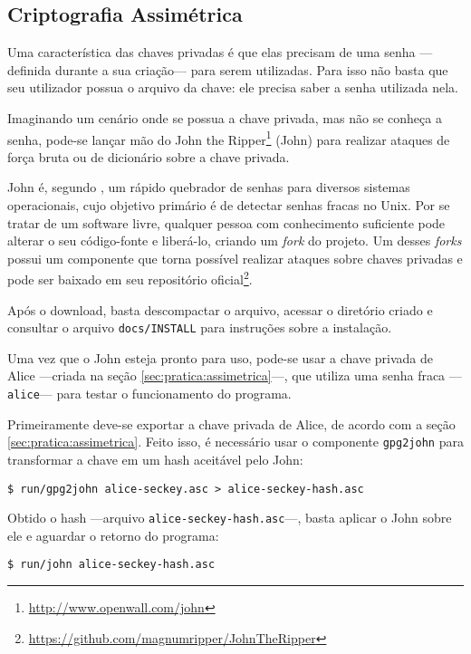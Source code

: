 \documentclass[12px,a4paper,twoside]{article}
\begin{document}
\subsection{Criptografia Assimétrica}
\label{sec:ataques:assimetrica}

Uma característica das chaves privadas é que elas precisam de uma senha
---definida durante a sua criação--- para serem utilizadas.  Para isso não
basta que seu utilizador possua o arquivo da chave: ele precisa saber a senha
utilizada nela.

Imaginando um cenário onde se possua a chave privada, mas não se conheça a
senha, pode-se lançar mão do John the
Ripper\footnote{\url{http://www.openwall.com/john}} (John) para realizar
ataques de força bruta ou de dicionário sobre a chave privada.

John é, segundo \cite{john}, um rápido quebrador de senhas para diversos
sistemas operacionais, cujo objetivo primário é de detectar senhas fracas no
Unix.  Por se tratar de um software livre, qualquer pessoa com conhecimento
suficiente pode alterar o seu código-fonte e liberá-lo, criando um
\textit{fork} do projeto.  Um desses \textit{forks} possui um componente que
torna possível realizar ataques sobre chaves privadas e pode ser baixado em seu
repositório
oficial\footnote{\url{https://github.com/magnumripper/JohnTheRipper}}.

Após o download, basta descompactar o arquivo, acessar o diretório criado e
consultar o arquivo \texttt{docs/INSTALL} para instruções sobre a instalação.

Uma vez que o John esteja pronto para uso, pode-se usar a chave privada de
Alice ---criada na seção \ref{sec:pratica:assimetrica}---, que utiliza uma
senha fraca ---\texttt{alice}--- para testar o funcionamento do programa.

Primeiramente deve-se exportar a chave privada de Alice, de acordo com a seção
\ref{sec:pratica:assimetrica}.  Feito isso, é necessário usar o componente
\texttt{gpg2john} para transformar a chave em um hash aceitável pelo John:

\begin{verbatim}
$ run/gpg2john alice-seckey.asc > alice-seckey-hash.asc
\end{verbatim}

Obtido o hash ---arquivo \texttt{alice-seckey-hash.asc}---, basta aplicar o
John sobre ele e aguardar o retorno do programa:

\begin{verbatim}
$ run/john alice-seckey-hash.asc
\end{verbatim}
\end{document}
